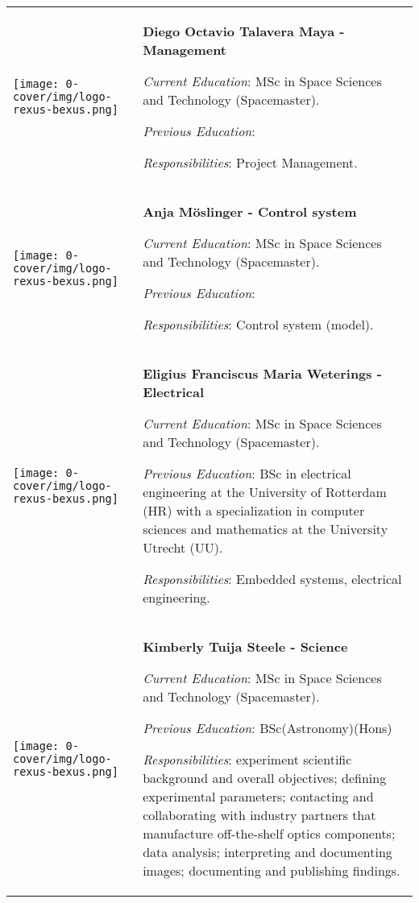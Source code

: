 
\begin{longtable}[]{m{} m{}}

\texttt{[image: 0-cover/img/logo-rexus-bexus.png]} & \textbf{Diego Octavio Talavera Maya - Management}

\smallskip
\textit{Current Education}: MSc in Space Sciences and Technology (Spacemaster).

\smallskip
\textit{Previous Education}:

\smallskip
\textit{Responsibilities}: Project Management.
\bigskip
\\

 \texttt{[image: 0-cover/img/logo-rexus-bexus.png]}  & \textbf{Anja M\"oslinger - Control system}

\smallskip
\textit{Current Education}: MSc in Space Sciences and Technology (Spacemaster).

\smallskip
\textit{Previous Education}:

\smallskip
\textit{Responsibilities}: Control system (model).
\bigskip
\\

 \texttt{[image: 0-cover/img/logo-rexus-bexus.png]}  & \textbf{Eligius Franciscus Maria Weterings - Electrical}

\smallskip
\textit{Current Education}: MSc in Space Sciences and Technology (Spacemaster).

\smallskip
\textit{Previous Education}: BSc in electrical engineering at the University of Rotterdam (HR) with a specialization in computer sciences and mathematics at the University Utrecht (UU). 

\smallskip
\textit{Responsibilities}: Embedded systems, electrical engineering.
\bigskip
\\
 \texttt{[image: 0-cover/img/logo-rexus-bexus.png]}  & \textbf{Kimberly Tuija Steele - Science}

\smallskip
\textit{Current Education}: MSc in Space Sciences and Technology (Spacemaster).

\smallskip
\textit{Previous Education}: BSc(Astronomy)(Hons)

\smallskip
\textit{Responsibilities}: experiment scientific background and overall objectives; defining experimental parameters; contacting and collaborating with industry partners that manufacture off-the-shelf optics components; data analysis; interpreting and documenting images; documenting and publishing findings.


\end{longtable}
